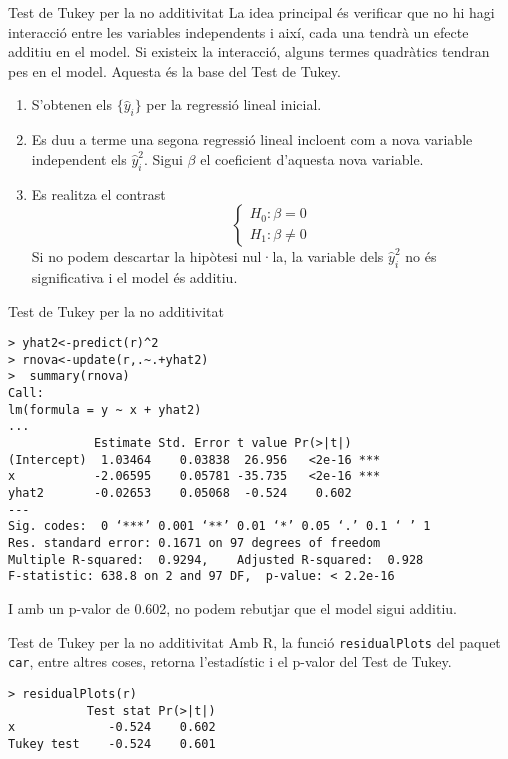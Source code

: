 \documentclass[12pt,t]{beamer}
\theoremstyle{plain}
\theoremstyle{definition}
\begin{document}
\begin{frame}{Test de Tukey per la no additivitat}
La idea principal és verificar que no hi hagi interacció entre les variables independents i així, cada una tendrà un efecte additiu en el model. Si existeix la interacció, alguns termes quadràtics tendran pes en el model. Aquesta és la base del Test de Tukey.  
\begin{enumerate}
\item S'obtenen els $\{\hat{y}_i\}$ per la regressió lineal inicial.
\item Es duu a terme una segona regressió lineal incloent com a nova variable independent els $\hat{y}_i^2$. Sigui $\beta$ el coeficient d'aquesta nova variable.
\item Es realitza el contrast
$$\left\{\begin{array}{ll} H_0:  \beta=0\\ H_1: \beta\neq 0\end{array}\right.$$
Si no podem descartar la hipòtesi nul·la, la variable dels  $\hat{y}_i^2$ no és significativa i el model és additiu. 
\end{enumerate}

\end{frame}

\begin{frame}[fragile]{Test de Tukey per la no additivitat}
\begin{footnotesize}


\begin{verbatim}
> yhat2<-predict(r)^2
> rnova<-update(r,.~.+yhat2)
>  summary(rnova)
Call:
lm(formula = y ~ x + yhat2)
...
            Estimate Std. Error t value Pr(>|t|)    
(Intercept)  1.03464    0.03838  26.956   <2e-16 ***
x           -2.06595    0.05781 -35.735   <2e-16 ***
yhat2       -0.02653    0.05068  -0.524    0.602    
---
Sig. codes:  0 ‘***’ 0.001 ‘**’ 0.01 ‘*’ 0.05 ‘.’ 0.1 ‘ ’ 1
Res. standard error: 0.1671 on 97 degrees of freedom
Multiple R-squared:  0.9294,	Adjusted R-squared:  0.928 
F-statistic: 638.8 on 2 and 97 DF,  p-value: < 2.2e-16
\end{verbatim}
\end{footnotesize}
I amb un p-valor de 0.602, no podem rebutjar que el model sigui additiu.
\end{frame}

\begin{frame}[fragile]{Test de Tukey per la no additivitat}
Amb R, la funció \texttt{residualPlots} del paquet \texttt{car}, entre altres coses, retorna l'estadístic i el p-valor del Test de Tukey.

\begin{verbatim}
> residualPlots(r)
           Test stat Pr(>|t|)
x             -0.524    0.602
Tukey test    -0.524    0.601
\end{verbatim}

\end{frame}
\end{document}

